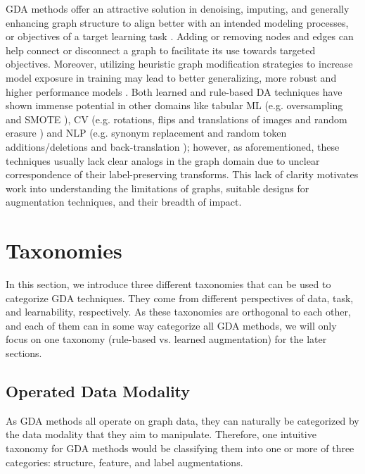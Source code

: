 \documentclass[11pt]{article}
\begin{document}
GDA methods offer an attractive solution in denoising, imputing, and generally enhancing graph structure to align better with an intended modeling processes, or objectives of a target learning task \cite{zhao2021data}.  Adding or removing nodes and edges can help connect or disconnect a graph to facilitate its use towards targeted objectives.  Moreover, utilizing heuristic graph modification strategies to increase model exposure in training may lead to better generalizing, more robust and higher performance models \cite{wang2020nodeaug, kong2020flag, zhou2020data}.  Both learned and rule-based DA techniques have shown immense potential in other domains like tabular ML (e.g. oversampling \cite{barandela2004imbalanced} and SMOTE \cite{chawla2002smote}),  CV (e.g. rotations, flips and translations of images \cite{shorten2019survey} and random erasure \cite{zhong2020random}) and NLP (e.g. synonym replacement and random token additions/deletions \cite{wei2019eda} and back-translation \cite{sennrich2015improving}); however, as aforementioned, these techniques usually lack clear analogs in the graph domain due to unclear correspondence of their label-preserving transforms.  This lack of clarity motivates work into understanding the limitations of graphs, suitable designs for augmentation techniques, and their breadth of impact. 

\section{Taxonomies}
\label{sec:tong_taxonomy}

In this section, we introduce three different taxonomies that can be used to categorize GDA techniques. They come from different perspectives of data, task, and learnability, respectively. As these taxonomies are orthogonal to each other, and each of them can in some way categorize all GDA methods, we will only focus on one taxonomy (rule-based vs. learned augmentation) for the later sections.

\subsection{Operated Data Modality}
As GDA methods all operate on graph data, they can naturally be categorized by the data modality that they aim to manipulate. Therefore, one intuitive taxonomy for GDA methods would be classifying them into one or more of three categories: structure, feature, and label augmentations.
\end{document}
